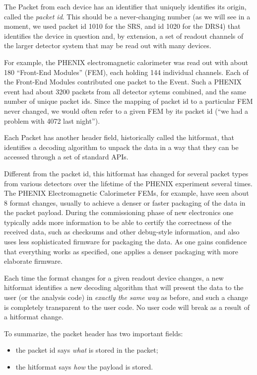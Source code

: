 \documentclass{article}[11pt]
\begin{document}
The Packet from each device has an identifier that uniquely identifies
its origin, called the \emph{packet id}. This should be a
never-changing number (as we will see in a moment, we used packet id
1010 for the SRS, and id 1020 for the DRS4) that identifies the device
in question and, by extension, a set of readout channels of the larger
detector system that may be read out with many devices.

For example, the PHENIX electromagnetic calorimeter was read out with
about 180 ``Front-End Modules'' (FEM), each holding 144 individual
channels. Each of the Front-End Modules contributed one packet to the
Event. Such a PHENIX event had about 3200 packets from all detector
sytems combined, and the same number of unique packet ids. Since the
mapping of packet id to a particular FEM never changed, we would often
refer to a given FEM by its packet id (``we had a problem with 4072
last night'').

Each Packet has another header field, historically called the
hitformat, that identifies a decoding algorithm to unpack the data in
a way that they can be accessed through a set of standard APIs.

Different from the packet id, this hitformat has changed for several
packet types from various detectors over the lifetime of the PHENIX
experiment several times. The PHENIX Electromagnetic Calorimeter FEMs,
for example, have seen about 8 format changes, usually to achieve a
denser or faster packaging of the data in the packet payload. During
the commissioning phase of new electronics one typically adds more
information to be able to certify the correctness of the received
data, such as checksums and other debug-style information, and also
uses less sophisticated firmware for packaging the data. As one gains
confidence that everything works as specified, one applies a denser
packaging with more elaborate firmware. 

Each time the format changes for a given readout device changes, a new
hitformat identifies a new decoding algorithm that will present the
data to the user (or the analysis code) in \emph{exactly the same way}
as before, and such a change is completely transparent to the user
code. No user code will break as a result of a hitformat change.

To summarize, the packet header has two important fields:

\begin{itemize}
\item the packet id says \emph{what} is stored in the packet;
\item the hitformat says \emph{how} the payload is stored.
\end{itemize}
\end{document}
